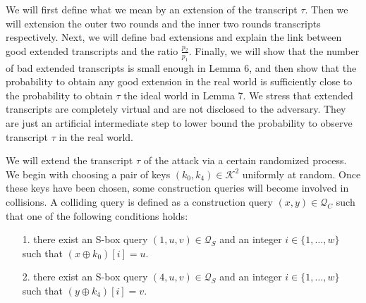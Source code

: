 We will first define what we mean by an extension of the transcript $\tau$. Then we will extension the outer two rounds and the inner two rounds transcripts respectively. Next, we will define bad extensions and explain the link between good extended transcripts and the ratio $\frac{p_2}{p_1}$. Finally, we will show that the number of bad extended transcripts is small enough in Lemma 6, and then show that the probability to obtain any good extension in the real world is sufficiently close to the probability to obtain $\tau$ the ideal world in Lemma 7. We stress that extended transcripts are completely virtual and are not disclosed to the adversary. They are just an artificial intermediate step to lower bound the probability to observe transcript $\tau$ in the real world.


We will extend the transcript $\tau$ of the attack via a certain randomized process. We begin with choosing a pair of keys $\left(k_{0}, k_{4}\right) \in \mathcal{K}^{2}$ uniformly at random. Once these keys have been chosen, some construction queries will become involved in collisions. A colliding query is defined as a construction query $(x, y) \in \mathcal{Q}_{C}$ such that one of the following conditions holds:

\begin{itemize}
  \item[1.]
  there exist an S-box query $(1, u, v) \in \mathcal{Q}_{S}$ and an integer $i \in\{1, \ldots, w\}$ such that $\left(x \oplus k_{0}\right)[i]=u$.
  \item[2.]
  there exist an S-box query $(4, u, v) \in \mathcal{Q}_{S}$ and an integer $i \in\{1, \ldots, w\}$ such that $\left(y \oplus k_{4}\right)[i]=v$.
\end{itemize}

